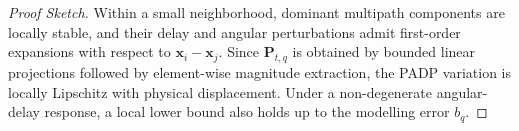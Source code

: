 \documentclass[10pt,a4paper]{amsart}
\begin{document}
\begin{proof}[Proof Sketch]
	Within a small neighborhood, dominant multipath components are locally stable, and their delay and angular perturbations admit first-order expansions with respect to \(\mathbf{x}_i-\mathbf{x}_j\). Since \(\mathbf{P}_{t,q}\) is obtained by bounded linear projections followed by element-wise magnitude extraction, the PADP variation is locally Lipschitz with physical displacement. Under a non-degenerate angular-delay response, a local lower bound also holds up to the modelling error \(b_q\).
\end{proof}
\end{document}
